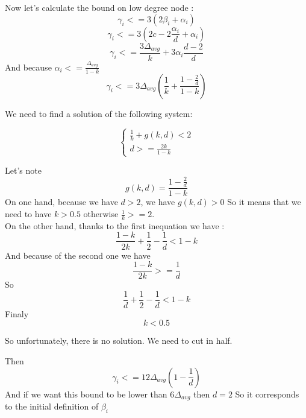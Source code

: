\documentclass{article}
\begin{document}
Now let's calculate the bound on low degree node :
$$\gamma_i <= 3(2\beta_i+\alpha_i)$$
$$\gamma_i <= 3(2c - 2\frac{\alpha_i}{d} + \alpha_i)$$
$$\gamma_i <= \frac{3\Delta_{avg}}{k} + 3\alpha_i\frac{d-2}{d}$$
And because $\alpha_i <= \frac{\Delta_{avg}}{1-k}$
$$\gamma_i <= 3\Delta_{avg}\left(\frac{1}{k}+\frac{1-\frac{2}{d}}{1-k}\right)$$

We need to find a solution of the following system:

\begin{equation*}
\begin{cases}
  \frac{1}{k} + g(k,d) < 2\\
  d >= \frac{2k}{1-k}
\end{cases}
\end{equation*}

Let's note $$g(k,d) = \frac{1-\frac{2}{d}}{1-k}$$
On one hand, because we have $d > 2$, we have $g(k, d) > 0$ So it means that we need
to have $k > 0.5$ otherwise $\frac{1}{k} >= 2$.\\

On the other hand, thanks to the first inequation we have :
$$\frac{1-k}{2k} + \frac{1}{2} - \frac{1}{d} < 1-k$$
And because of the second one we have 
$$\frac{1-k}{2k} >= \frac{1}{d}$$
So $$\frac{1}{d} + \frac{1}{2} - \frac{1}{d} < 1 - k$$
Finaly $$k < 0.5$$

So unfortunately, there is no solution. We need to cut in half.

Then $$\gamma_i <= 12\Delta_{avg}\left(1-\frac{1}{d}\right)$$
And if we want this bound to be lower than $6\Delta_{avg}$ then $d = 2$
So it corresponds to the initial definition of $\beta_i$ 
\end{document}
